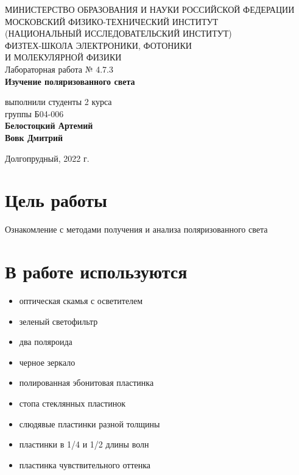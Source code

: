 \documentclass[a4paper,12pt]{article}
\begin{document}
 

\begin{titlepage}
	\begin{center}
		\large 	МИНИСТЕРСТВО ОБРАЗОВАНИЯ И НАУКИ РОССИЙСКОЙ ФЕДЕРАЦИИ\\
				МОСКОВСКИЙ ФИЗИКО-ТЕХНИЧЕСКИЙ ИНСТИТУТ \\
				(НАЦИОНАЛЬНЫЙ ИССЛЕДОВАТЕЛЬСКИЙ ИНСТИТУТ)\\ 
				ФИЗТЕХ-ШКОЛА ЭЛЕКТРОНИКИ, ФОТОНИКИ \\
				И МОЛЕКУЛЯРНОЙ ФИЗИКИ \\
		
		
		\vspace{4.0 cm}
		Лабораторная работа № 4.7.3 \\ 
		\LARGE \textbf{Изучение поляризованного света}
	\end{center}
	\vspace{3 cm} \large
	
	\begin{flushright}
		выполнили студенты 2 курса \\
		{группы Б04-006}\\
		\textbf{Белостоцкий Артемий}\\
		\textbf{Вовк Дмитрий}\\
	\end{flushright}
	
	\vfill

	\begin{center}
	Долгопрудный, 2022 г.
	\end{center}
\end{titlepage}                                                                      

\section*{Цель работы}
Ознакомление с методами получения и анализа поляризованного света

\section*{В работе используются}
\begin{itemize}
\item оптическая скамья с осветителем
\item зеленый светофильтр
\item два поляроида
\item черное зеркало
\item полированная эбонитовая пластинка
\item стопа стеклянных пластинок
\item слюдявые пластинки разной толщины
\item пластинки в 1/4 и 1/2 длины волн
\item пластинка чувствительного оттенка
\end{itemize}
\end{document}
